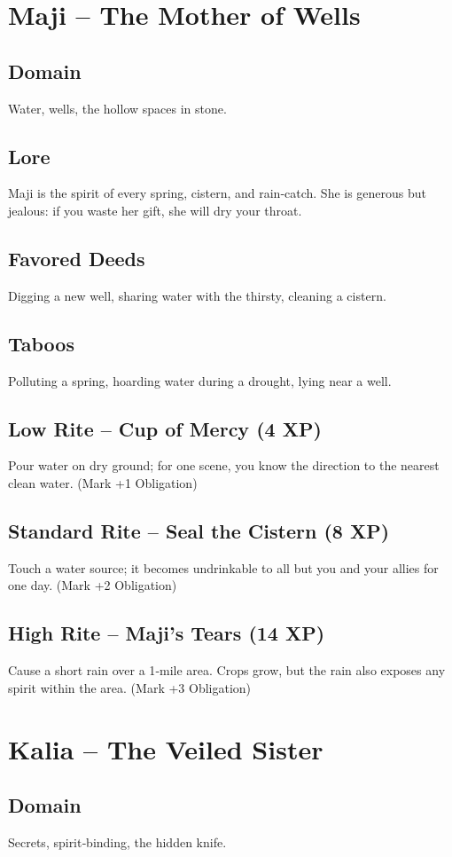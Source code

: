 \documentclass[11pt]{book}
\begin{document}
\section{Maji -- The Mother of Wells}
\subsection*{Domain}
Water, wells, the hollow spaces in stone.
\subsection*{Lore}
Maji is the spirit of every spring, cistern, and rain‑catch. She is generous but jealous: if you waste her gift, she will dry your throat.
\subsection*{Favored Deeds}
Digging a new well, sharing water with the thirsty, cleaning a cistern.
\subsection*{Taboos}
Polluting a spring, hoarding water during a drought, lying near a well.
\subsection*{Low Rite -- Cup of Mercy (4 XP)}
Pour water on dry ground; for one scene, you know the direction to the nearest clean water. (Mark +1 Obligation)
\subsection*{Standard Rite -- Seal the Cistern (8 XP)}
Touch a water source; it becomes undrinkable to all but you and your allies for one day. (Mark +2 Obligation)
\subsection*{High Rite -- Maji's Tears (14 XP)}
Cause a short rain over a 1‑mile area. Crops grow, but the rain also exposes any spirit within the area. (Mark +3 Obligation)

\section{Kalia -- The Veiled Sister}
\subsection*{Domain}
Secrets, spirit‑binding, the hidden knife.
\end{document}
